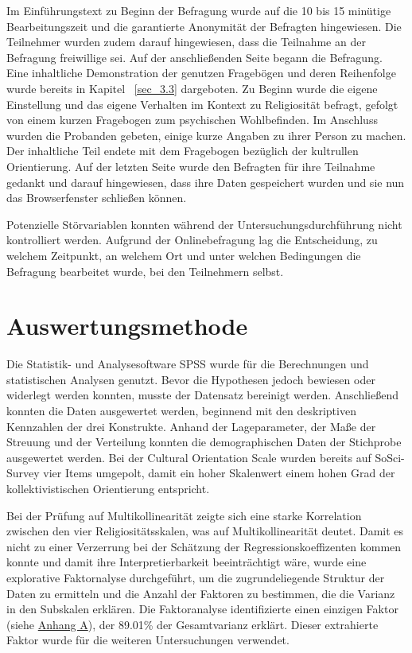 Im Einführungstext zu Beginn der Befragung wurde auf die 10 bis 15 minütige Bearbeitungszeit und die garantierte Anonymität der Befragten hingewiesen. Die Teilnehmer wurden zudem darauf hingewiesen, dass die Teilnahme an der Befragung freiwillige sei. Auf der anschließenden Seite begann die Befragung. Eine inhaltliche Demonstration der genutzen Fragebögen und deren Reihenfolge wurde bereits in Kapitel ~\ref{sec_3.3} dargeboten. Zu Beginn wurde die eigene Einstellung und das eigene Verhalten im Kontext zu Religiosität befragt, gefolgt von einem kurzen Fragebogen zum psychischen Wohlbefinden. Im Anschluss wurden die Probanden gebeten, einige kurze Angaben zu ihrer Person zu machen. Der inhaltliche Teil endete mit dem Fragebogen bezüglich der kultrullen Orientierung. Auf der letzten Seite wurde den Befragten für ihre Teilnahme gedankt und darauf hingewiesen, dass ihre Daten gespeichert wurden und sie nun das Browserfenster schließen können.

Potenzielle Störvariablen konnten während der Untersuchungsdurchführung nicht kontrolliert werden. Aufgrund der Onlinebefragung lag die Entscheidung, zu welchem Zeitpunkt, an welchem Ort und unter welchen Bedingungen die Befragung bearbeitet wurde, bei den Teilnehmern selbst.


\section{Auswertungsmethode}    \label{sec_3.5}
Die Statistik- und Analysesoftware SPSS wurde für die Berechnungen und statistischen Analysen genutzt. Bevor die Hypothesen jedoch bewiesen oder widerlegt werden konnten, musste der Datensatz bereinigt werden. Anschließend konnten die Daten ausgewertet werden, beginnend mit den deskriptiven Kennzahlen der drei Konstrukte. Anhand der Lageparameter, der Maße der Streuung und der Verteilung konnten die demographischen Daten der Stichprobe ausgewertet werden. Bei der Cultural Orientation Scale wurden bereits auf SoSci-Survey vier Items umgepolt, damit ein hoher Skalenwert einem hohen Grad der kollektivistischen Orientierung entspricht.


Bei der Prüfung auf Multikollinearität zeigte sich eine starke Korrelation zwischen den vier Religiositätsskalen, was auf Multikollinearität deutet. Damit es nicht zu einer Verzerrung bei der Schätzung der Regressionskoeffizenten kommen konnte und damit ihre Interpretierbarkeit beeinträchtigt wäre, wurde eine explorative Faktornalyse durchgeführt, um die zugrundeliegende Struktur der Daten zu ermitteln und die Anzahl der Faktoren zu bestimmen, die die Varianz in den Subskalen erklären. Die Faktoranalyse identifizierte einen einzigen Faktor (siehe \hyperref [ScreePlot]{Anhang A}), der 89.01\% der Gesamtvarianz erklärt. Dieser extrahierte Faktor wurde für die weiteren Untersuchungen verwendet. 


